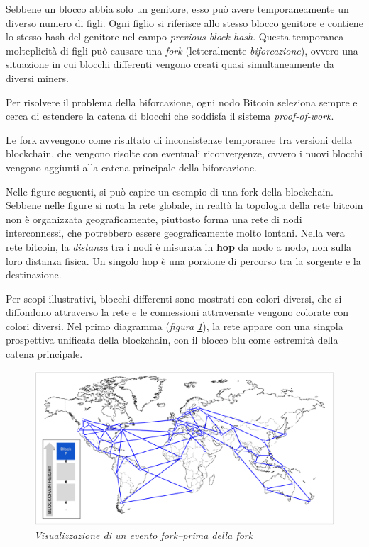 Sebbene un blocco abbia solo un genitore, esso può avere temporaneamente un diverso numero di figli. Ogni figlio si riferisce allo stesso blocco genitore e contiene lo stesso hash del genitore nel campo  \textit{previous block hash}. Questa temporanea molteplicità di figli può causare una \textit{fork} (letteralmente \textit{biforcazione}), ovvero una situazione in cui blocchi differenti vengono creati quasi simultaneamente da diversi miners.

Per risolvere il problema della biforcazione, ogni nodo Bitcoin seleziona sempre e cerca di estendere la catena di blocchi che soddisfa il sistema \textit{proof-of-work}.

Le fork avvengono come risultato di inconsistenze temporanee tra versioni della blockchain,
che vengono risolte con eventuali riconvergenze, ovvero i nuovi blocchi vengono aggiunti alla catena principale della biforcazione.

Nelle figure seguenti, si può capire un esempio di una fork della blockchain. Sebbene nelle figure si nota la rete globale, in realtà la topologia della rete bitcoin non è organizzata geograficamente, piuttosto forma una rete di nodi interconnessi, che potrebbero essere geograficamente molto lontani. Nella vera rete bitcoin, la \textit{distanza} tra i nodi è misurata in \textbf{hop} da nodo a nodo, non sulla loro distanza fisica. Un singolo hop è una porzione di percorso tra la sorgente e la destinazione. 

Per scopi illustrativi, blocchi differenti sono mostrati con colori diversi, che si diffondono attraverso la rete e le connessioni attraversate vengono colorate con colori diversi.
Nel primo diagramma (\textit{figura \ref{fig:fork1}}), la rete appare con una singola prospettiva unificata della blockchain, con il blocco blu come estremità della catena principale.
\begin{figure}[h]
	\centering
	\includegraphics[width=0.85 \linewidth]{figure/fork1}
	\caption{\textit{Visualizzazione di un evento fork--prima della fork} \label{fig:fork1}}
\end{figure}

